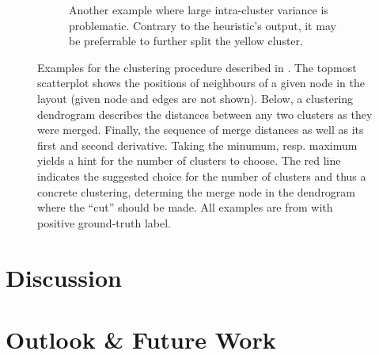 \documentclass[
	fontsize=10pt, %
	twoside=true, %
	secnumdepth=1, %
  toc=indentunnumbered %
]{kaobook}
\begin{document}
\begin{figure}[h]
\begin{subfigure}{0.48\linewidth}
        \caption{Another example where large intra-cluster variance is
          problematic. Contrary to the heuristic's output, it may be preferrable
          to further split the yellow cluster.}
      \end{subfigure}
      \caption[
      Example outputs of the heuristic for attaching edges after node
      duplication has been decided.
      ]
      {
    Examples for the clustering procedure described in . The topmost scatterplot shows the positions of neighbours
    of a given node in the layout (given node and edges are not shown). Below, a clustering dendrogram describes
    the distances between any two clusters as they were merged. Finally, the
    sequence of merge distances as well as its first and second derivative.
    Taking the minumum, resp. maximum yields a hint for the number of clusters
    to choose. The red line indicates the suggested choice for the number of
    clusters and thus a concrete clustering, determing the merge node in the
    dendrogram where the ``cut'' should be made.
    All examples are from \ADLast{} with positive ground-truth label.}
  \label{fig:neighb-clust-examples}
\end{figure}


\chapter{Discussion}
\label{sec:discussion}








\chapter{Outlook \& Future Work}
\label{sec:future-work}
\end{document}
